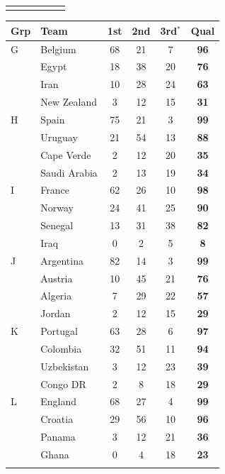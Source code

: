 \documentclass[11pt,letterpaper]{article}
\begin{document}
\begin{table}[ht]
\begin{minipage}{0.49\textwidth}
\begin{tabular}{llcccc}
\addlinespace
\bottomrule
\end{tabular}
\end{minipage}\hfill
\begin{minipage}{0.49\textwidth}\centering
\begin{tabular}{llcccc}
\toprule
Grp & Team & 1st & 2nd & 3rd$^{*}$ & Qual \\
\midrule
G & Belgium & 68 & 21 & 7 & \textbf{96} \\
 & Egypt & 18 & 38 & 20 & \textbf{76} \\
 & Iran & 10 & 28 & 24 & \textbf{63} \\
 & New Zealand & 3 & 12 & 15 & \textbf{31} \\
\addlinespace
H & Spain & 75 & 21 & 3 & \textbf{99} \\
 & Uruguay & 21 & 54 & 13 & \textbf{88} \\
 & Cape Verde & 2 & 12 & 20 & \textbf{35} \\
 & Saudi Arabia & 2 & 13 & 19 & \textbf{34} \\
\addlinespace
I & France & 62 & 26 & 10 & \textbf{98} \\
 & Norway & 24 & 41 & 25 & \textbf{90} \\
 & Senegal & 13 & 31 & 38 & \textbf{82} \\
 & Iraq & 0 & 2 & 5 & \textbf{8} \\
\addlinespace
J & Argentina & 82 & 14 & 3 & \textbf{99} \\
 & Austria & 10 & 45 & 21 & \textbf{76} \\
 & Algeria & 7 & 29 & 22 & \textbf{57} \\
 & Jordan & 2 & 12 & 15 & \textbf{29} \\
\addlinespace
K & Portugal & 63 & 28 & 6 & \textbf{97} \\
 & Colombia & 32 & 51 & 11 & \textbf{94} \\
 & Uzbekistan & 3 & 12 & 23 & \textbf{39} \\
 & Congo DR & 2 & 8 & 18 & \textbf{29} \\
\addlinespace
L & England & 68 & 27 & 4 & \textbf{99} \\
 & Croatia & 29 & 56 & 10 & \textbf{96} \\
 & Panama & 3 & 12 & 21 & \textbf{36} \\
 & Ghana & 0 & 4 & 18 & \textbf{23} \\
\addlinespace
\bottomrule
\end{tabular}
\end{minipage}
\end{table}
\end{document}
